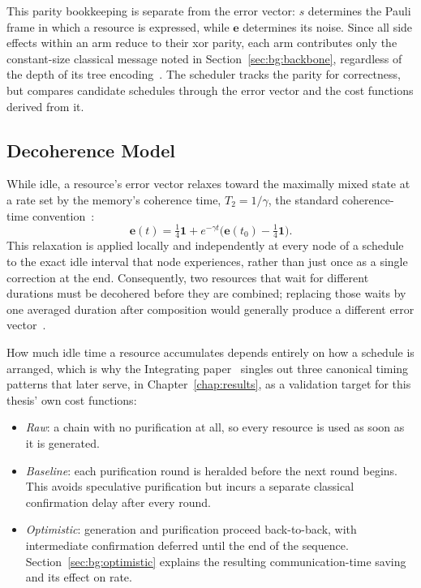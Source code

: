 This parity bookkeeping is separate from the error vector: $s$ determines the Pauli frame in which a resource is expressed, while $\mathbf{e}$ determines its noise. Since all side effects within an arm reduce to their \Gls{xor} parity, each arm contributes only the constant-size classical message noted in Section~\ref{sec:bg:backbone}, regardless of the depth of its tree encoding~\cite{Benchasattabuse2026Bridging}. The scheduler tracks the parity for correctness, but compares candidate schedules through the error vector and the cost functions derived from it.

\subsection{Decoherence Model}
\label{sec:bg:decoherence}

While idle, a resource's error vector relaxes toward the maximally mixed state at a rate set by the memory's coherence time, $T_2 = 1/\gamma$, the standard coherence-time convention~\cite{Nielsen2010Quantum}:
\[
    \mathbf{e}(t) = \tfrac{1}{4}\mathbf{1} +
    e^{-\gamma t}\bigl(\mathbf{e}(t_0) - \tfrac{1}{4}\mathbf{1}\bigr).
\]
This relaxation is applied locally and independently at every node of a schedule to the exact idle interval that node experiences, rather than just once as a single correction at the end. Consequently, two resources that wait for different durations must be decohered before they are combined; replacing those waits by one averaged duration after composition would generally produce a different error vector~\cite{Benchasattabuse2025Integrating,Benchasattabuse2026Bridging}.

How much idle time a resource accumulates depends entirely on how a schedule is arranged, which is why the Integrating paper~\cite{Benchasattabuse2025Integrating} singles out three canonical timing patterns that later serve, in Chapter~\ref{chap:results}, as a validation target for this thesis' own cost functions:

\begin{itemize}
    \item \emph{Raw}: a chain with no purification at all, so every resource is used as soon as it is generated.
    \item \emph{Baseline}: each purification round is heralded before the next round begins. This avoids speculative purification but incurs a separate classical confirmation delay after every round.
    \item \emph{Optimistic}: generation and purification proceed back-to-back, with intermediate confirmation deferred until the end of the sequence. Section~\ref{sec:bg:optimistic} explains the resulting communication-time saving and its effect on rate.
\end{itemize}

